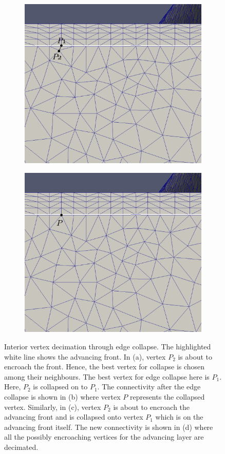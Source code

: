 \begin{figure}[hbt!]
	\begin{subfigure}{.5\textwidth}
		\centering
		\includegraphics[width=.9\linewidth, trim={0 5cm 0  0}, clip]{img/m2/interior-vert-collapse/cc3.eps}
		\caption{}
		\label{cc3}
	\end{subfigure}%
	\begin{subfigure}{.5\textwidth}
		\centering
		\includegraphics[width=.9\linewidth, trim={0 5cm 0  0}, clip]{img/m2/interior-vert-collapse/cc4.eps}
		\caption{}
		\label{cc4}
	\end{subfigure}
	\caption[Interior vertex decimation through edge collapse.]{Interior vertex decimation through edge collapse. The highlighted white line shows the advancing front. In (a), vertex $P_2$ is about to encroach the front. Hence, the best vertex for collapse is chosen among their neighbours. The best vertex for edge collapse here is $P_1$. Here, $P_2$ is collapsed on to $P_1$. The connectivity after the edge collapse is shown in (b) where vertex $P$ represents the collapsed vertex. Similarly, in (c), vertex $P_2$ is about to encroach the advancing front and is collapsed onto vertex $P_1$ which is on the advancing front itself. The new connectivity is shown in (d) where all the possibly encroaching vertices for the advancing layer are decimated.}

\end{figure}
